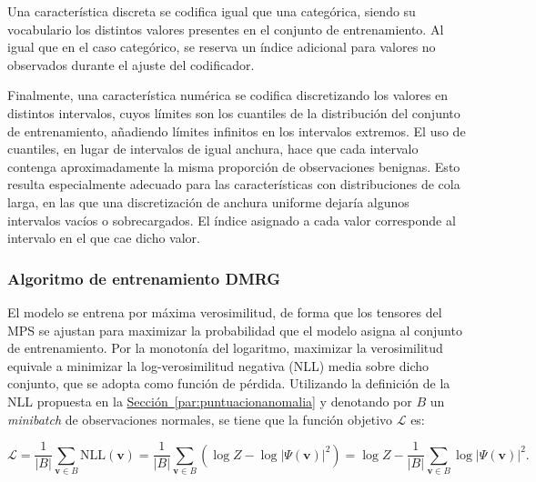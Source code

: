 \documentclass[12pt]{extarticle}
\numberwithin{equation}{section}
\begin{document}
\begin{refsection}
Una característica discreta se codifica igual que una categórica, siendo su vocabulario los distintos valores presentes en el conjunto de entrenamiento. Al igual que en el caso categórico, se reserva un índice adicional para valores no observados durante el ajuste del codificador.

Finalmente, una característica numérica se codifica discretizando los valores en distintos intervalos, cuyos límites son los cuantiles de la distribución del conjunto de entrenamiento, añadiendo límites infinitos en los intervalos extremos. El uso de cuantiles, en lugar de intervalos de igual anchura, hace que cada intervalo contenga aproximadamente la misma proporción de observaciones benignas. Esto resulta especialmente adecuado para las características con distribuciones de cola larga, en las que una discretización de anchura uniforme dejaría algunos intervalos vacíos o sobrecargados. El índice asignado a cada valor corresponde al intervalo en el que cae dicho valor.

\subsubsection{Algoritmo de entrenamiento DMRG}
\label{subsubsec:algoritmoentrenamiento}

El modelo se entrena por máxima verosimilitud, de forma que los tensores del MPS se ajustan para maximizar la probabilidad que el modelo asigna al conjunto de entrenamiento. Por la monotonía del logaritmo, maximizar la verosimilitud equivale a minimizar la log-verosimilitud negativa (NLL) media sobre dicho conjunto, que se adopta como función de pérdida. Utilizando la definición de la NLL propuesta en la \hyperref[par:puntuacionanomalia]{Sección~\ref*{par:puntuacionanomalia}} y denotando por $B$ un \textit{minibatch} de observaciones normales, se tiene que la función objetivo $\mathcal{L}$ es:

\begin{equation}
    \mathcal{L}
    = \frac{1}{|B|} \sum_{\mathbf{v} \in B} \mathrm{NLL}(\mathbf{v})
    = \frac{1}{|B|} \sum_{\mathbf{v} \in B} \left( \log Z - \log |\Psi(\mathbf{v})|^2 \right)
    = \log Z - \frac{1}{|B|} \sum_{\mathbf{v} \in B} \log |\Psi(\mathbf{v})|^2 .
    \label{eq:funcionperdida}
\end{equation}


\end{refsection}
\end{document}
